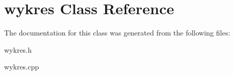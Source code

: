\hypertarget{classwykres}{}\section{wykres Class Reference}
\label{classwykres}


The documentation for this class was generated from the following files\+:\begin{DoxyCompactItemize}
\item 
wykres.\+h\item 
wykres.\+cpp\end{DoxyCompactItemize}
